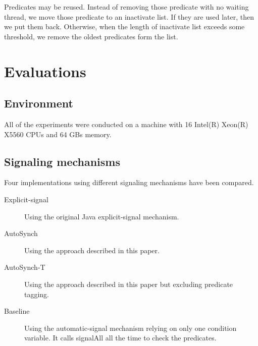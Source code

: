 \documentclass[preprint]{sigplanconf}
\begin{document}
Predicates may be reused. Instead  of removing those predicate with no waiting
thread, 
we move those predicate to an inactivate list. If they are used later, then we 
put them back. Otherwise, when the length of inactivate list exceeds some 
threshold, we remove the oldest predicates form the list.


\section{Evaluations} \label{sec:eval}
\subsection{Environment}
All of the experiments were conducted on a machine with 16 
Intel(R) Xeon(R) X5560 CPUs and 64 GBs memory. 


\subsection{Signaling mechanisms}
Four implementations using different signaling mechanisms have been 
compared. 
\begin{description}
    \item[Explicit-signal] Using the original Java explicit-signal mechanism. 
    \item[AutoSynch] Using the approach described in this paper. 
    \item[AutoSynch-T] Using the approach described in this paper but excluding
        predicate tagging. 
    \item[Baseline] Using the automatic-signal mechanism relying on only
        one condition variable. It calls signalAll all the time to check the
        predicates.
\end{description}
\end{document}
